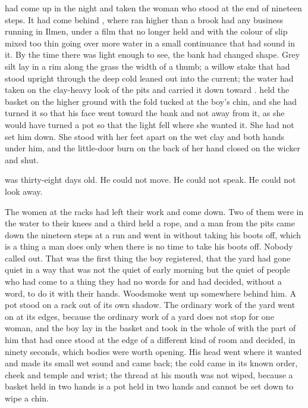 
 had come up in the night and taken the woman who stood at the end of nineteen steps. It had come behind , where  ran higher than a brook had any business running in Ilmen, under a film that no longer held and with the colour of slip mixed too thin going over more water in a small continuance that had sound in it. By the time there was light enough to see, the bank had changed shape. Grey silt lay in a rim along the grass the width of a thumb; a willow stake that had stood upright through the deep cold leaned out into the current; the water had taken on the clay-heavy look of the pits and carried it down toward .  held the basket on the higher ground with the fold tucked at the boy's chin, and she had turned it so that his face went toward the bank and not away from it, as she would have turned a pot so that the light fell where she wanted it. She had not set him down. She stood with her feet apart on the wet clay and both hands under him, and the little-door burn on the back of her hand closed on the wicker and shut.

 was thirty-eight days old. He could not move. He could not speak. He could not look away.

The women at the racks had left their work and come down. Two of them were in the water to their knees and a third held a rope, and a man from the pits came down the nineteen steps at a run and went in without taking his boots off, which is a thing a man does only when there is no time to take his boots off. Nobody called out. That was the first thing the boy registered, that the yard had gone quiet in a way that was not the quiet of early morning but the quiet of people who had come to a thing they had no words for and had decided, without a word, to do it with their hands. Woodsmoke went up somewhere behind him. A pot stood on a rack out of its own shadow. The ordinary work of the yard went on at its edges, because the ordinary work of a yard does not stop for one woman, and the boy lay in the basket and took in the whole of  with the part of him that had once stood at the edge of a different kind of room and decided, in ninety seconds, which bodies were worth opening. His head went where it wanted and made its small wet sound and came back; the cold came in its known order, cheek and temple and wrist; the thread at his mouth was not wiped, because a basket held in two hands is a pot held in two hands and cannot be set down to wipe a chin.


